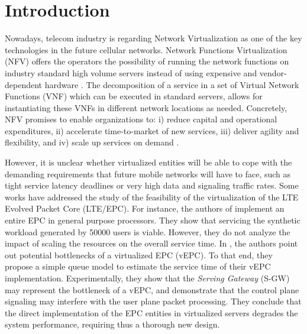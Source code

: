 \documentclass[conference]{IEEEtran}
\begin{document}
\section{Introduction}
 
 Nowadays, telecom industry is regarding Network Virtualization as one of the key technologies in the future cellular networks. Network Functions Virtualization (NFV) offers the operators the possibility of running the network functions on industry standard high volume servers instead of using expensive and vendor-dependent hardware \cite{nfv-etsi}\cite{nfv-survey}. The decomposition of a service in a set of Virtual Network Functions (VNF) which can be executed in standard servers, allows for instantiating these VNFs in different network locations as needed. 
 Concretely, NFV promises to enable organizations to: i) reduce capital and operational expenditures, ii) accelerate time-to-market of new services, iii) deliver agility and flexibility, and iv) scale up services on demand \cite{nfv-etsi}. 

However, it is unclear whether virtualized entities will be able to cope with the demanding requirements that future mobile networks will have to face, such as tight service latency deadlines or very high data and signaling traffic rates. 
  Some works have addressed the study of the feasibility of the virtualization of the LTE Evolved Packet Core (LTE/EPC). For instance, the authors of \cite{Hirschman15} implement an entire EPC in general purpose processors. They show that servicing the synthetic workload generated by 50000 users is viable. However, they do not analyze the impact of scaling the resources on the overall service time. 
   In \cite{rajan15}, the authors point out potential bottlenecks of  a virtualized EPC (vEPC). To that end, they propose a simple queue model to estimate the service time of their vEPC implementation. Experimentally, they show that the \emph{Serving Gateway} (S-GW) may represent the bottleneck of a vEPC, and demonstrate that the control plane signaling may interfere with the user plane packet processing. They conclude that the direct implementation of the EPC entities in virtualized servers degrades the system performance, requiring thus a thorough new design.
   
\end{document}
